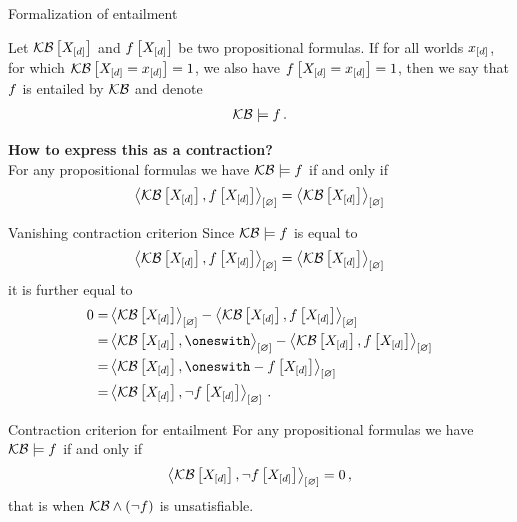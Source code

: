 \documentclass{beamer}
\begin{document}
    \begin{frame}{Formalization of entailment}
        \begin{definition}[Entailment]
            Let $\mathcal{KB}\left[X_{[d]}\right]$ and $f\left[X_{[d]}\right]$ be two propositional formulas.
            If for all worlds $x_{[d]}$, for which $\mathcal{KB}\left[X_{[d]}=x_{[d]}\right]=1$, we also have $f\left[X_{[d]}=x_{[d]}\right]=1$, then we say that $f$ is entailed by $\mathcal{KB}$ and denote
            \begin{align*}
                \mathcal{KB} \models f \, .
            \end{align*}
        \end{definition}

        \textbf{How to express this as a contraction?}\\
        For any propositional formulas we have $\mathcal{KB}\models f$ if and only if
        \begin{align*}
            \left\langle \mathcal{KB}\left[X_{[d]}\right],f\left[X_{[d]}\right]\right\rangle_{\left[ \varnothing \right]}
            = \left\langle \mathcal{KB}\left[X_{[d]}\right]\right\rangle_{\left[ \varnothing \right]}
        \end{align*}
    \end{frame}

    \begin{frame}{Vanishing contraction criterion}
        Since $\mathcal{KB}\models f$ is equal to
        \begin{align*}
            \left\langle \mathcal{KB}\left[X_{[d]}\right],f\left[X_{[d]}\right]\right\rangle_{\left[ \varnothing \right]} = \left\langle \mathcal{KB}\left[X_{[d]}\right]\right\rangle_{\left[ \varnothing \right]}
        \end{align*}
        it is further equal to
        \begin{align*}
            0 =& \contraction{\kbwith}-\contraction{\kbwith,\formulawith} \\
            =& \contraction{\kbwith,\oneswith}-\contraction{\kbwith,\formulawith} \\
            = & \contraction{\kbwith,\oneswith-\formulawith} \\
            =&\contraction{\kbwith,\lnot\formulawith} \, .
        \end{align*}
        \vspace{-0.5cm}
        \begin{block}{Contraction criterion for entailment}
            For any propositional formulas we have $\mathcal{KB}\models f$ if and only if
            \begin{align*}
                \left\langle \mathcal{KB}\left[X_{[d]}\right],\lnot f\left[X_{[d]}\right]\right\rangle_{\left[ \varnothing \right]} = 0 \, ,
            \end{align*}
            that is when $\mathcal{KB}\land(\lnot f)$ is unsatisfiable.
        \end{block}
    \end{frame}
\end{document}
